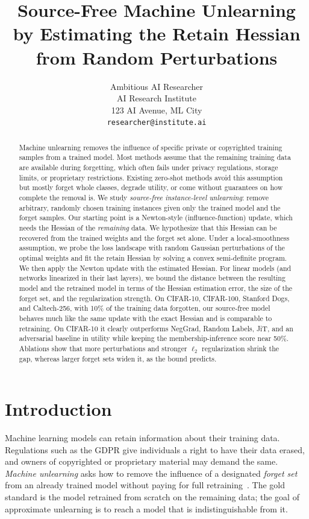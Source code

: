 \documentclass[10pt,twocolumn,letterpaper]{article}
\title{Source-Free Machine Unlearning by Estimating the Retain Hessian from Random Perturbations}
\author{Ambitious AI Researcher\\
AI Research Institute\\
123 AI Avenue, ML City\\
{\tt\small researcher@institute.ai}
}
\begin{document}
\maketitle

\begin{abstract}
Machine unlearning removes the influence of specific private or copyrighted training samples from a trained model. Most methods assume that the remaining training data are available during forgetting, which often fails under privacy regulations, storage limits, or proprietary restrictions. Existing zero-shot methods avoid this assumption but mostly forget whole classes, degrade utility, or come without guarantees on how complete the removal is. We study \emph{source-free instance-level unlearning}: remove arbitrary, randomly chosen training instances given only the trained model and the forget samples. Our starting point is a Newton-style (influence-function) update, which needs the Hessian of the \emph{remaining} data. We hypothesize that this Hessian can be recovered from the trained weights and the forget set alone. Under a local-smoothness assumption, we probe the loss landscape with random Gaussian perturbations of the optimal weights and fit the retain Hessian by solving a convex semi-definite program. We then apply the Newton update with the estimated Hessian. For linear models (and networks linearized in their last layers), we bound the distance between the resulting model and the retrained model in terms of the Hessian estimation error, the size of the forget set, and the regularization strength. On CIFAR-10, CIFAR-100, Stanford Dogs, and Caltech-256, with 10\% of the training data forgotten, our source-free model behaves much like the same update with the exact Hessian and is comparable to retraining. On CIFAR-10 it clearly outperforms NegGrad, Random Labels, JiT, and an adversarial baseline in utility while keeping the membership-inference score near 50\%. Ablations show that more perturbations and stronger $\ell_2$ regularization shrink the gap, whereas larger forget sets widen it, as the bound predicts.
\end{abstract}

\section{Introduction}
\label{sec:intro}
Machine learning models can retain information about their training data. Regulations such as the GDPR give individuals a right to have their data erased, and owners of copyrighted or proprietary material may demand the same. \emph{Machine unlearning} asks how to remove the influence of a designated \emph{forget set} from an already trained model without paying for full retraining~\cite{cao2015towards,ginart2019making,bourtoule2021machine,xu2023machine,xu2024machine}. The gold standard is the model retrained from scratch on the remaining data; the goal of approximate unlearning is to reach a model that is indistinguishable from it.
\end{document}
